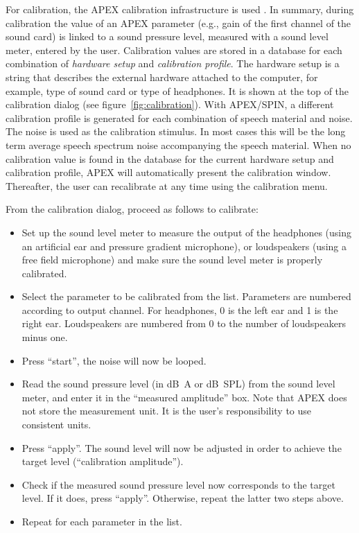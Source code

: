 {For calibration, the APEX calibration infrastructure is used
\citep{Francart2008}. In summary, during calibration the value of an
APEX parameter (e.g., gain of the first channel of the sound card) is
linked to a sound pressure level, measured with a sound level meter,
entered by the user. Calibration values are stored in a database for
each combination of \emph{hardware setup} and \emph{calibration
profile}. The hardware setup is a string that describes the external
hardware attached to the computer, for example, type of sound card or type of
headphones. It is shown at the top of the calibration dialog (see
figure~\ref{fig:calibration}). With APEX/SPIN, a different calibration
profile is generated for each combination of speech material and noise.
The noise is used as the calibration stimulus. In most cases this will
be the long term average speech spectrum noise accompanying the speech
material. When no calibration value is found in the database for the
current hardware setup and calibration profile, APEX will automatically
present the calibration window. Thereafter, the user can recalibrate at
any time using the calibration menu.

 From the calibration dialog, proceed as follows to calibrate:

\begin{itemize}
\itemsep1pt\parskip0pt
\item
  Set up the sound level meter to measure the output of the headphones
  (using an artificial ear and pressure gradient microphone), or
  loudspeakers (using a free field microphone) and make sure the sound
  level meter is properly calibrated.
\item
  Select the parameter to be calibrated from the list. Parameters are
  numbered according to output channel. For headphones, 0 is the left
  ear and 1 is the right ear. Loudspeakers are numbered from 0 to the
  number of loudspeakers minus one.
\item
  Press ``start'', the noise will now be looped.
\item
  Read the sound pressure level (in dB~A or dB~SPL) from the sound level
  meter, and enter it in the ``measured amplitude'' box. Note that APEX
  does not store the measurement unit. It is the user's responsibility
  to use consistent units.
\item
  Press ``apply''. The sound level will now be adjusted in order to
  achieve the target level (``calibration amplitude'').
\item
  Check if the measured sound pressure level now corresponds to the
  target level. If it does, press ``apply''. Otherwise, repeat the
  latter two steps above.
\item
 Repeat for each parameter in the list.
\end{itemize}

}
